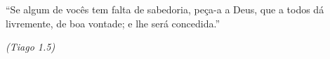 \thispagestyle{empty}

\vspace*{\fill}
\begin{flushright}
	\begin{minipage}{8cm}
		\epigraph{``Se algum de vocês tem falta de sabedoria, peça-a a Deus, que a todos dá livremente, de boa vontade; e lhe será concedida.''}{\textit{(Tiago 1.5)}}
	\end{minipage}
\end{flushright}


